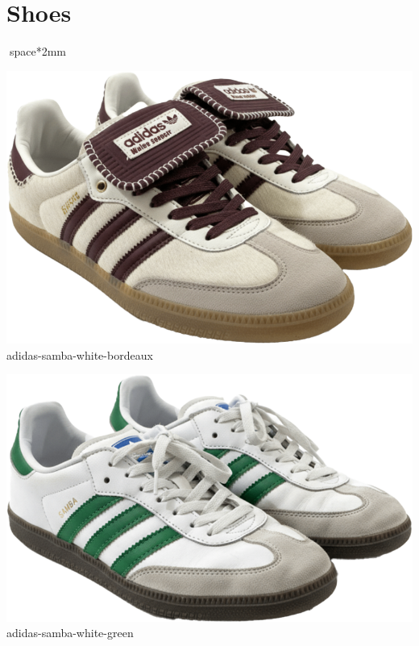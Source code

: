\documentclass[10pt]{article}
\begin{document}
\section*{Shoes}space*{2mm}
\begin{minipage}[t]{0.22\textwidth}\centering\vspace{0mm}
\includegraphics[width=\linewidth,keepaspectratio]{assets/shoes/adidas-samba-white-bordeaux.png}\\
\vspace{0.5mm}\tiny adidas-samba-white-bordeaux\end{minipage}
\begin{minipage}[t]{0.22\textwidth}\centering\vspace{0mm}
\includegraphics[width=\linewidth,keepaspectratio]{assets/shoes/adidas-samba-white-green.png}\\
\vspace{0.5mm}\tiny adidas-samba-white-green\end{minipage}
\end{document}
